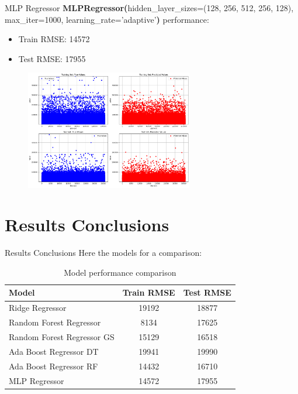 \documentclass{beamer}
\begin{document}
\begin{frame}{MLP Regressor}
\textbf{MLPRegressor(}hidden\_layer\_sizes=(128, 256, 512, 256, 128), max\_iter=1000, learning\_rate='adaptive'\textbf{)} performance:
        \begin{itemize}
            \item Train RMSE: 14572
            \item Test RMSE: 17955
        \end{itemize}
    \begin{figure}
        \centering
        \includegraphics[width=0.65\textwidth]{images/MLPregressor_plot2.png}
    \end{figure}
\end{frame}

\section{Results Conclusions}
\begin{frame}{Results Conclusions}
Here the models for a comparison:
    \begin{table}[h!]
    \centering
    \renewcommand{\arraystretch}{1.3}
    \setlength{\tabcolsep}{12pt}
    \begin{tabular}{|l|c|c|}
        \hline
        \textbf{Model} & \textbf{Train RMSE} & \textbf{Test RMSE} \\
        \hline
        Ridge Regressor & 19192 & 18877 \\
        Random Forest Regressor & 8134 & 17625 \\
        Random Forest Regressor GS & 15129 & 16518 \\
        Ada Boost Regressor DT & 19941 & 19990 \\
        Ada Boost Regressor RF & 14432 & 16710 \\
        MLP Regressor & 14572 & 17955 \\
        \hline
    \end{tabular}
    \caption{Model performance comparison}
    \end{table}
\end{frame}
\end{document}
